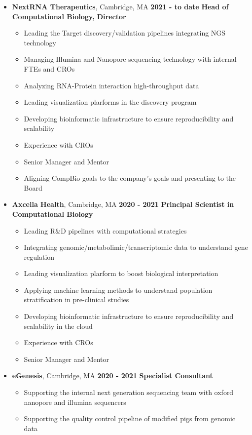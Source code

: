 \begin{itemize}

\item
\textbf{NextRNA Therapeutics}, Cambridge, MA \hfill \textbf{2021 - to date}
\newline
\textbf{Head of Computational Biology, Director}
\begin{itemize}
\item
  Leading the Target discovery/validation pipelines integrating NGS technology
\item 
  Managing Illumina and Nanopore sequencing technology with internal FTEs and CROs
\item
  Analyzing RNA-Protein interaction high-throughput data
\item
  Leading visualization plarforms in the discovery program
\item  
  Developing bioinformatic infrastructure to ensure reproducibility and scalability
\item
  Experience with CROs
\item
 Senior Manager and Mentor
\item
 Aligning CompBio goals to the company's goals and presenting to the Board
\end{itemize}

\item
\textbf{Axcella Health}, Cambridge, MA \hfill \textbf{2020 - 2021}
\newline
\textbf{Principal Scientist in Computational Biology}
\begin{itemize}
\item
  Leading R\&D pipelines with computational strategies
\item
  Integrating genomic/metabolimic/transcriptomic data to understand gene regulation
\item 
  Leading visualization plarform to boost biological interpretation
\item
  Applying machine learning methods to understand population stratification in pre-clinical studies
\item 
  Developing bioinformatic infrastructure to ensure reproducibility and scalability in the cloud
\item
  Experience with CROs
\item
  Senior Manager and Mentor
\end{itemize}

\item
\textbf{eGenesis}, Cambridge, MA \hfill \textbf{2020 - 2021}
\newline
\textbf{Specialist Consultant}
\begin{itemize}
\item Supporting the internal next generation sequencing team with oxford nanopore and illumina sequencers
\item Supporting the quality control pipeline of modified pigs from genomic data
\end{itemize}



\end{itemize}
